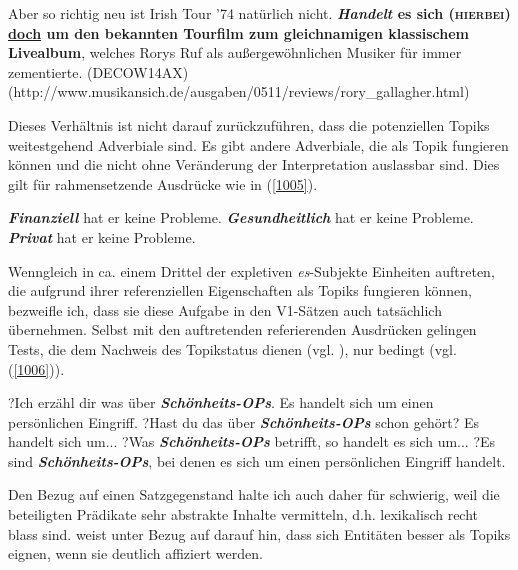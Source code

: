 {\begin{exe}
	\ex\label{1004} 
	\scriptsize
	Aber so richtig neu ist Irish Tour '74 natürlich nicht. \textbf{\textit{Handelt} es sich (\textsc{hierbei}) \underline{doch} um den be\-kannten Tourfilm 		zum gleichnamigen klassischem Livealbum}, welches Rorys Ruf als außergewöhnlichen Musiker für immer zementierte.      		
	\hfill\hbox {(DECOW14AX)}
	\newline
	\hbox{}\hfill\hbox{(http://www.musikansich.de/ausgaben/0511/reviews/rory\_gallagher.html)}
\end{exe}								                      
Dieses Verhältnis ist nicht darauf zurückzuführen, dass die potenziellen Topiks weitestgehend Adverbiale  sind. Es gibt andere Adverbiale, die als Topik fungieren können und die nicht ohne Veränderung der Interpretation auslassbar sind. Dies gilt für rahmensetzende Ausdrücke wie in (\ref{1005}).

\begin{exe}
	\ex\label{1005} 
		\begin{xlist}	
			\ex\label{1005a} \textbf{\textit{Finanziell}} hat er keine Probleme.
			\ex\label{1005b} \textbf{\textit{Gesundheitlich}} hat er keine Probleme.
			\ex\label{1005c} \textbf{\textit{Privat}} hat er keine Probleme.
			\hfill\hbox {\citet[42]{Helbig1981}}
		\end{xlist}
\end{exe}
Wenngleich in ca. einem Drittel der expletiven \textit{es}-Subjekte Einheiten auftreten, die aufgrund ihrer referenziellen Eigenschaften als Topiks fungieren können, bezweifle ich, dass sie diese Aufgabe in den V1-Sätzen auch tatsächlich überneh\-men. Selbst mit den auftretenden referierenden Ausdrücken gelingen Tests, die dem Nachweis des Topikstatus dienen (vgl. \citealt[28-29]{Musan2010}), nur bedingt (vgl. (\ref{1006})).

\begin{exe}
	\ex\label{1006} 
		\begin{xlist}	
			\ex\label{1006a} ?Ich erzähl dir was über \textbf{\textit{Schönheits-OPs}}. Es handelt sich um einen persönlichen Eingriff.
			\ex\label{1006b} ?Hast du das über \textbf{\textit{Schönheits-OPs}} schon gehört? Es handelt sich um...
			\ex\label{1006c} ?Was \textbf{\textit{Schönheits-OPs}} betrifft, so handelt es sich um...
			\ex\label{1006d} ?Es sind \textbf{\textit{Schönheits-OPs}}, bei denen es sich um einen persönlichen Eingriff handelt.
		\end{xlist}
\end{exe}
Den Bezug auf einen Satzgegenstand halte ich auch daher für schwierig, weil die beteiligten Prädikate sehr abstrakte Inhalte vermitteln, d.h. lexikalisch recht blass sind. \citet[68]{Reinhart1981} weist unter Bezug auf \citet{Kuno1972} darauf hin, dass sich Entitäten besser als Topiks eignen, wenn sie deutlich affiziert werden.

}
